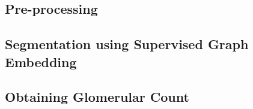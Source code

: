 
\subsection{Pre-processing}

\subsection{Segmentation using Supervised Graph Embedding}

\subsection{Obtaining Glomerular Count}


%
%
